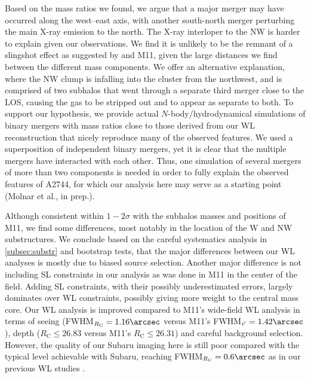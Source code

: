 \documentclass[iop,twocolumn]{emulateapj}
\begin{document}
Based on the 
mass ratios we found, we argue that a major merger may have occurred along the 
west--east axis, with another south-north merger perturbing the main X-ray 
emission to the north. The X-ray interloper to the NW is harder to explain 
given our observations. We find it is unlikely to be the remnant of a slingshot 
effect as suggested by \cite{Owers2011} and M11, given the large distances we 
find between the different mass components. We offer an alternative explanation, 
where the NW clump is infalling into the cluster from the northwest, and is 
comprised of two subhalos that went through a separate third merger close to the LOS, causing the gas to be stripped out and to appear as separate to both. To support our hypothesis, we provide actual $N$-body/hydrodynamical simulations of binary mergers with mass ratios close to those derived from our WL reconstruction that nicely reproduce many of the observed features.
%
We used a superposition of independent binary mergers, yet
it is clear that the multiple mergers have interacted with each other. 
Thus, one simulation of several mergers of more than two components is needed in order to fully explain the observed features of A2744,
for which our analysis here may serve as a starting point
(Molnar et al., in prep.).


Although consistent within $1-2\sigma$ with the subhalos masses and positions of M11, we find some differences, most notably in the location of the W and NW substructures. We conclude based on the careful systematics analysis in \autoref{subsec:substr} and bootstrap tests, that the major differences between our WL analyses is mostly due to biased source selection. Another major difference is not including SL constraints in our analysis as was done in M11 in the center of the field. Adding SL constraints, with their possibly underestimated errors, largely dominates over WL constraints, possibly giving more weight to the central mass core. Our WL analysis is improved compared to M11's wide-field WL analysis in terms of seeing (FWHM$_{R_\mathrm{C}}=1.16\arcsec$ versus M11's FWHM$_{i'}=1.42\arcsec$), depth (${R_\mathrm{C}}\leq26.83$ versus M11's ${R_\mathrm{C}}\leq26.31$) and careful background selection. However, the quality of our Subaru imaging here is still poor compared with the typical level achievable with Subaru, reaching FWHM$_{R_\mathrm{C}}=0.6\arcsec$ as in our previous WL studies \citep{Medezinski2010,Umetsu2014}. 
\end{document}
